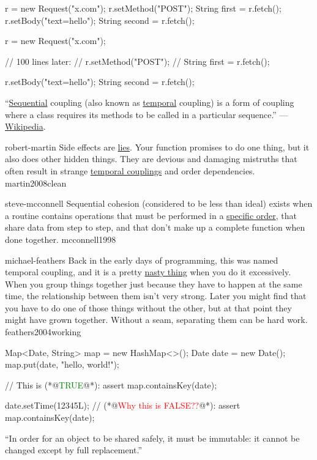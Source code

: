 \documentclass{article}
\begin{document}
\begin{pptWide}{2}
{\small\begin{ffcode}
r = new Request("x.com");
r.setMethod("POST");
String first = r.fetch();
r.setBody("text=hello");
String second = r.fetch();
\end{ffcode}
}
\par\columnbreak\par
{\small\begin{ffcode}
r = new Request("x.com");

// 100 lines later:
// r.setMethod("POST");
// String first = r.fetch();

r.setBody("text=hello");
String second = r.fetch();
\end{ffcode}
}
\end{pptWide}
\par
``\ul{Sequential} coupling (also known as \ul{temporal} coupling) is a form of coupling where a class requires its methods to be called in a particular sequence.'' --- \href{https://en.wikipedia.org/wiki/Sequential_coupling}{Wikipedia}.
\plush{}

\qte
  {robert-martin}
  {Side effects are \ul{lies}. Your function promises to do one thing, but it also does other hidden things. They are devious and damaging mistruths that often result in strange \ul{temporal couplings} and order dependencies.}
  {martin2008clean}

\qte
  {steve-mcconnell}
  {Sequential cohesion (considered to be less than ideal) exists when a routine contains operations that must be performed in a \ul{specific order}, that share data from step to step, and that don't make up a complete function when done together.}
  {mcconnell1998}

\qte
  {michael-feathers}
  {Back in the early days of programming, this was named temporal coupling, and it is a pretty \ul{nasty thing} when you do it excessively. When you group things together just because they have to happen at the same time, the relationship between them isn’t very strong. Later you might find that you have to do one of those things without the other, but at that point they might have grown together. Without a seam, separating them can be hard work.}
  {feathers2004working}

\begin{pptWide}{2}
{\small\begin{ffcode}
Map<Date, String> map = new HashMap<>();
Date date = new Date();
map.put(date, "hello, world!");

// This is (*@\textcolor{green}{TRUE}@*):
assert map.containsKey(date);

date.setTime(12345L);
// (*@\textcolor{red}{Why this is FALSE??}@*):
assert map.containsKey(date);
\end{ffcode}
}
\par\columnbreak\par
``In order for an object to be shared safely, it must be immutable: it cannot be changed except by full replacement.''\par
{}
\end{pptWide}
\plush{}
\end{document}
